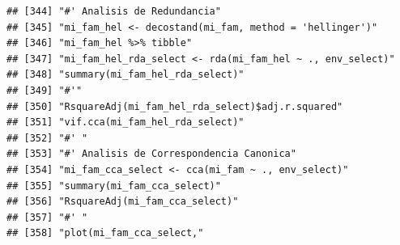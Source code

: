 \documentclass[11pt,]{article}
\begin{document}
\begin{verbatim}
## [344] "#' Analisis de Redundancia"                                                                                                                                            
## [345] "mi_fam_hel <- decostand(mi_fam, method = 'hellinger')"                                                                                                                 
## [346] "mi_fam_hel %>% tibble"                                                                                                                                                 
## [347] "mi_fam_hel_rda_select <- rda(mi_fam_hel ~ ., env_select)"                                                                                                              
## [348] "summary(mi_fam_hel_rda_select)"                                                                                                                                        
## [349] "#'"                                                                                                                                                                    
## [350] "RsquareAdj(mi_fam_hel_rda_select)$adj.r.squared"                                                                                                                       
## [351] "vif.cca(mi_fam_hel_rda_select)"                                                                                                                                        
## [352] "#' "                                                                                                                                                                   
## [353] "#' Analisis de Correspondencia Canonica"                                                                                                                               
## [354] "mi_fam_cca_select <- cca(mi_fam ~ ., env_select)"                                                                                                                      
## [355] "summary(mi_fam_cca_select)"                                                                                                                                            
## [356] "RsquareAdj(mi_fam_cca_select)"                                                                                                                                         
## [357] "#' "                                                                                                                                                                   
## [358] "plot(mi_fam_cca_select,"                                                                                                                                               

\end{verbatim}
\end{document}
